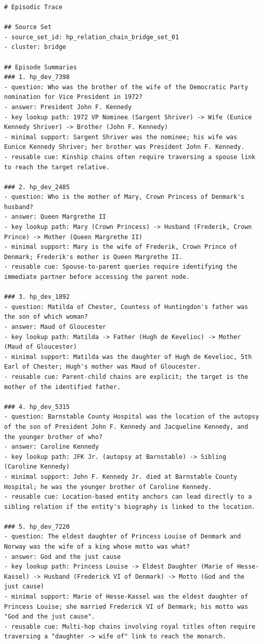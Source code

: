 \begin{lstlisting}
# Episodic Trace

## Source Set
- source_set_id: hp_relation_chain_bridge_set_01
- cluster: bridge

## Episode Summaries
### 1. hp_dev_7398
- question: Who was the brother of the wife of the Democratic Party nomination for Vice President in 1972?
- answer: President John F. Kennedy
- key lookup path: 1972 VP Nominee (Sargent Shriver) -> Wife (Eunice Kennedy Shriver) -> Brother (John F. Kennedy)
- minimal support: Sargent Shriver was the nominee; his wife was Eunice Kennedy Shriver; her brother was President John F. Kennedy.
- reusable cue: Kinship chains often require traversing a spouse link to reach the target relative.

### 2. hp_dev_2485
- question: Who is the mother of Mary, Crown Princess of Denmark's husband?
- answer: Queen Margrethe II
- key lookup path: Mary (Crown Princess) -> Husband (Frederik, Crown Prince) -> Mother (Queen Margrethe II)
- minimal support: Mary is the wife of Frederik, Crown Prince of Denmark; Frederik's mother is Queen Margrethe II.
- reusable cue: Spouse-to-parent queries require identifying the immediate partner before accessing the parent node.

### 3. hp_dev_1892
- question: Matilda of Chester, Countess of Huntingdon's father was the son of which woman?
- answer: Maud of Gloucester
- key lookup path: Matilda -> Father (Hugh de Kevelioc) -> Mother (Maud of Gloucester)
- minimal support: Matilda was the daughter of Hugh de Kevelioc, 5th Earl of Chester; Hugh's mother was Maud of Gloucester.
- reusable cue: Parent-child chains are explicit; the target is the mother of the identified father.

### 4. hp_dev_5315
- question: Barnstable County Hospital was the location of the autopsy of the son of President John F. Kennedy and Jacqueline Kennedy, and the younger brother of who?
- answer: Caroline Kennedy
- key lookup path: JFK Jr. (autopsy at Barnstable) -> Sibling (Caroline Kennedy)
- minimal support: John F. Kennedy Jr. died at Barnstable County Hospital; he was the younger brother of Caroline Kennedy.
- reusable cue: Location-based entity anchors can lead directly to a sibling relation if the entity's biography is linked to the location.

### 5. hp_dev_7220
- question: The eldest daughter of Princess Louise of Denmark and Norway was the wife of a king whose motto was what?
- answer: God and the just cause
- key lookup path: Princess Louise -> Eldest Daughter (Marie of Hesse-Kassel) -> Husband (Frederick VI of Denmark) -> Motto (God and the just cause)
- minimal support: Marie of Hesse-Kassel was the eldest daughter of Princess Louise; she married Frederick VI of Denmark; his motto was "God and the just cause".
- reusable cue: Multi-hop chains involving royal titles often require traversing a "daughter -> wife of" link to reach the monarch.


\end{lstlisting}
